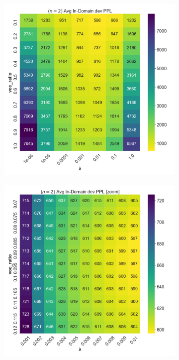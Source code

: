 \documentclass[11pt]{article}
\begin{document}
\begin{figure}[ht]
\begin{subfigure}{0.5\textwidth}
  \includegraphics[width=\textwidth]{figures/n=2.png}
\end{subfigure}
\begin{subfigure}{0.5\textwidth}
  \includegraphics[width=\textwidth]{figures/n=2_zoom.png}
\end{subfigure}


\end{figure}
\end{document}
